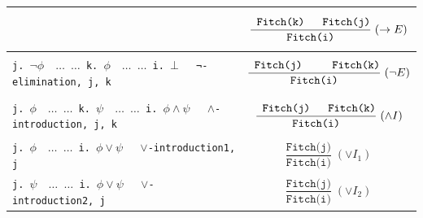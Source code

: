 \documentclass{article}
\begin{document}
\begin{center}
\begin{longtable}{|p{}|p{}|}
&
$$\displaystyle
\frac{\texttt{ Fitch(k) \quad Fitch(j)}}{\texttt{Fitch(i)}}\;(\to E)
$$
\\

\hline

\texttt{j. $ \neg \phi \quad  \dots$
     \newline
     $\dots$
     \newline
     k.  $\phi  \quad  \dots$
     \newline
     $\dots$
     \newline
     i. $\bot \quad$ ¬-elimination, j, k
     }





&
$$\displaystyle
\frac{\texttt{ Fitch(j) \qquad Fitch(k)}}{\texttt{Fitch(i)}}\;(\neg E)
$$
\\

\hline





\texttt{j. $  \phi \quad  \dots$
     \newline
     $\dots$
     \newline
     k.  $\psi  \quad  \dots$
     \newline
     $\dots$
     \newline
     i. $\phi \land \psi \quad$ $\wedge$-introduction, j, k}





&
$$\displaystyle
\frac{\texttt{ Fitch(j) \quad Fitch(k)}}{\texttt{Fitch(i)}}\;(\wedge I)
$$






\\

\hline



\texttt{j. $  \phi \quad  \dots$
     \newline
     $\dots$
     \newline
     i. $\phi \lor \psi \quad$ $\lor$-introduction1, j}
&
$$\displaystyle
\frac{\texttt{Fitch(j)}}{\texttt{Fitch(i)}}\;(\lor I_1)
$$
\\

\hline


\texttt{j. $  \psi \quad  \dots$
     \newline
     $\dots$
     \newline
     i. $\phi \lor \psi \quad$ $\lor$-introduction2, j}
&
$$\displaystyle
\frac{\texttt{Fitch(j)}}{\texttt{Fitch(i)}}\;(\lor I_2)
$$
\\


\end{longtable}
\end{center}
\end{document}
